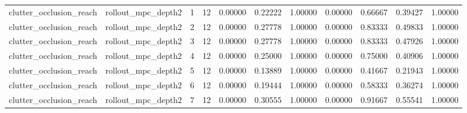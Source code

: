 \documentclass{article}
\begin{document}
\begin{table}[tbp]
{\begin{tabular}{lllllllllll}
clutter\_occlusion\_reach & rollout\_mpc\_depth2 & 1 & 12 & 0.00000 & 0.22222 & 1.00000 & 0.00000 & 0.66667 & 0.39427 & 1.00000 \\
clutter\_occlusion\_reach & rollout\_mpc\_depth2 & 2 & 12 & 0.00000 & 0.27778 & 1.00000 & 0.00000 & 0.83333 & 0.49833 & 1.00000 \\
clutter\_occlusion\_reach & rollout\_mpc\_depth2 & 3 & 12 & 0.00000 & 0.27778 & 1.00000 & 0.00000 & 0.83333 & 0.47926 & 1.00000 \\
clutter\_occlusion\_reach & rollout\_mpc\_depth2 & 4 & 12 & 0.00000 & 0.25000 & 1.00000 & 0.00000 & 0.75000 & 0.40906 & 1.00000 \\
clutter\_occlusion\_reach & rollout\_mpc\_depth2 & 5 & 12 & 0.00000 & 0.13889 & 1.00000 & 0.00000 & 0.41667 & 0.21943 & 1.00000 \\
clutter\_occlusion\_reach & rollout\_mpc\_depth2 & 6 & 12 & 0.00000 & 0.19444 & 1.00000 & 0.00000 & 0.58333 & 0.36274 & 1.00000 \\
clutter\_occlusion\_reach & rollout\_mpc\_depth2 & 7 & 12 & 0.00000 & 0.30555 & 1.00000 & 0.00000 & 0.91667 & 0.55541 & 1.00000 \\
\bottomrule
\end{tabular}
}
\end{table}

\clearpage
\end{document}
